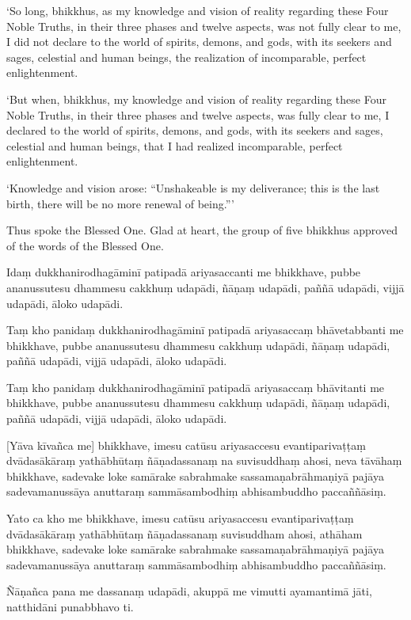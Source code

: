‘So long, bhikkhus, as my knowledge and vision of reality regarding
these Four Noble Truths, in their three phases and twelve aspects, was
not fully clear to me, I did not declare to the world of spirits,
demons, and gods, with its seekers and sages, celestial and human
beings, the realization of incomparable, perfect enlightenment.

‘But when, bhikkhus, my knowledge and vision of reality regarding these
Four Noble Truths, in their three phases and twelve aspects, was fully
clear to me, I declared to the world of spirits, demons, and gods, with
its seekers and sages, celestial and human beings, that I had realized
incomparable, perfect enlightenment.

‘Knowledge and vision arose: “Unshakeable is my deliverance; this is
the last birth, there will be no more renewal of being.”\thinspace ’

Thus spoke the Blessed One. Glad at heart, the group of five bhikkhus
approved of the words of the Blessed One.

\clearpage

\paliText
\markboth{\paliTitle}{\rightmark}

Idaṃ dukkhanirodhagāminī patipadā ariyasaccanti me bhikkhave, pubbe
ananussutesu dhammesu cakkhuṃ udapādi, ñāṇaṃ udapādi, paññā udapādi,
vijjā udapādi, āloko udapādi.

Taṃ kho panidaṃ dukkhanirodhagāminī patipadā ariyasaccaṃ bhāvetabbanti
me bhikkhave, pubbe ananussutesu dhammesu cakkhuṃ udapādi, ñāṇaṃ
udapādi, paññā udapādi, vijjā udapādi, āloko udapādi.

Taṃ kho panidaṃ dukkhanirodhagāminī patipadā ariyasaccaṃ bhāvitanti me
bhikkhave, pubbe ananussutesu dhammesu cakkhuṃ udapādi, ñāṇaṃ udapādi,
paññā udapādi, vijjā udapādi, āloko udapādi.

[Yāva kīvañca me] bhikkhave, imesu catūsu ariyasaccesu evantiparivaṭṭaṃ
dvādasākāraṃ yathābhūtaṃ ñāṇadassanaṃ na suvisuddhaṃ ahosi, neva tāvāhaṃ
bhikkhave, sadevake loke samārake sabrahmake sassamaṇabrāhmaṇiyā pajāya
sadevamanussāya anuttaraṃ sammāsambodhiṃ abhisambuddho paccaññāsiṃ.

Yato ca kho me bhikkhave, imesu catūsu ariyasaccesu evantiparivaṭṭaṃ
dvādasākāraṃ yathābhūtaṃ ñāṇadassanaṃ suvisuddham ahosi, athāham
bhikkhave, sadevake loke samārake sabrahmake sassamaṇabrāhmaṇiyā pajāya
sadevamanussāya anuttaraṃ sammāsambodhiṃ abhisambuddho paccaññāsiṃ.

Ñāṇañca pana me dassanaṃ udapādi, akuppā me vimutti ayamantimā jāti,
natthidāni punabbhavo ti.

